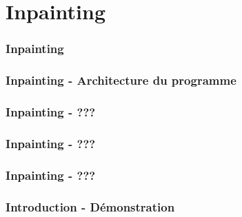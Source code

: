 
 \section{Inpainting}
\begin{frame}
  \frametitle{Inpainting}

\end{frame}



\begin{frame}
  \frametitle{Inpainting - Architecture du programme}


\end{frame}



\begin{frame}
  \frametitle{Inpainting - ???}

\end{frame}



\begin{frame}
  \frametitle{Inpainting - ???}

\end{frame}



\begin{frame}
  \frametitle{Inpainting - ???}

\end{frame}


 \begin{frame}
   \frametitle{Introduction - Démonstration}


 \end{frame}